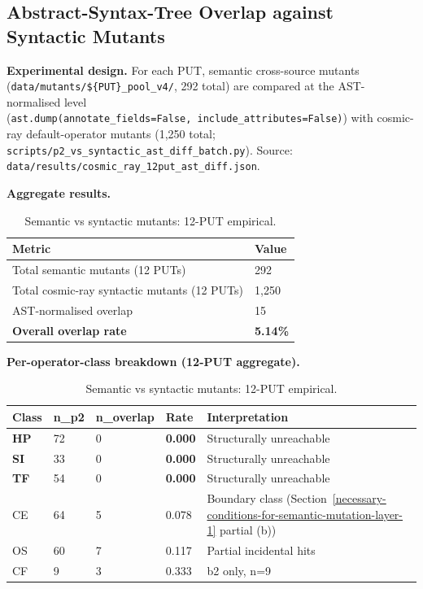 \documentclass[12pt]{article}
\begin{document}
\subsection{Abstract-Syntax-Tree Overlap against Syntactic Mutants}\label{p2-vs-syntactic-mutants-12-put-empirical-layer-3}

\textbf{Experimental design.} For each PUT, semantic cross-source mutants
(\texttt{data/mutants/\$\{PUT\}\_pool\_v4/}, 292 total) are compared at
the AST-normalised level
(\texttt{ast.dump(annotate\_fields=False,\ include\_attributes=False)})
with cosmic-ray default-operator mutants (1,250 total;
\texttt{scripts/p2\_vs\_syntactic\_ast\_diff\_batch.py}). Source:
\texttt{data/results/cosmic\_ray\_12put\_ast\_diff.json}.

\textbf{Aggregate results.}

{\def\LTcaptype{table} %
\begin{longtable}[]{@{}ll@{}}
\caption{Semantic vs syntactic mutants: 12-PUT empirical.}\label{tab:p2-04}\\
\toprule\noalign{}
Metric & Value \\
\midrule\noalign{}
\endfirsthead
\endhead
\bottomrule\noalign{}
\endlastfoot
Total semantic mutants (12 PUTs) & 292 \\
Total cosmic-ray syntactic mutants (12 PUTs) & 1,250 \\
AST-normalised overlap & 15 \\
\textbf{Overall overlap rate} & \textbf{5.14\%} \\
\end{longtable}
}

\textbf{Per-operator-class breakdown (12-PUT aggregate).}

{\def\LTcaptype{table} %
\begin{longtable}[]{@{}lllll@{}}
\caption{Semantic vs syntactic mutants: 12-PUT empirical.}\label{tab:p2-05}\\
\toprule\noalign{}
Class & n\_p2 & n\_overlap & Rate & Interpretation \\
\midrule\noalign{}
\endfirsthead
\endhead
\bottomrule\noalign{}
\endlastfoot
\textbf{HP} & 72 & 0 & \textbf{0.000} & Structurally unreachable \\
\textbf{SI} & 33 & 0 & \textbf{0.000} & Structurally unreachable \\
\textbf{TF} & 54 & 0 & \textbf{0.000} & Structurally unreachable \\
CE & 64 & 5 & 0.078 & Boundary class (Section~\ref{necessary-conditions-for-semantic-mutation-layer-1} partial (b)) \\
OS & 60 & 7 & 0.117 & Partial incidental hits \\
CF & 9 & 3 & 0.333 & b2 only, n=9 \\
\end{longtable}
}
\end{document}
